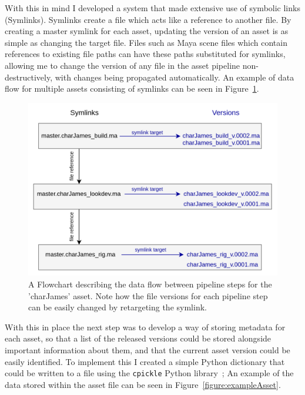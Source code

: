 \documentclass[11pt]{article}
\begin{document}
With this in mind I developed a system that made extensive use of symbolic links (Symlinks). Symlinks create a file which acts like a reference to another file. By creating a master symlink for each asset, updating the version of an asset is as simple as changing the target file. Files such as Maya scene files which contain references to existing file paths can have these paths substituted for symlinks, allowing me to change the version of any file in the asset pipeline non-destructively, with changes being propagated automatically. An example of data flow for multiple assets consisting of symlinks can be seen in Figure~\ref{figure:assetPipeline}.

\begin{figure}[htbp]\centering
	\includegraphics[width=1.0\linewidth]{images/asset_pipeline.png}
	\caption{\label{figure:assetPipeline} A Flowchart describing the data flow between pipeline steps for the 'charJames' asset. Note how the file versions for each pipeline step can be easily changed by retargeting the symlink.}
\end{figure}

With this in place the next step was to develop a way of storing metadata for each asset, so that a list of the released versions could be stored alongside important information about them, and that the current asset version could be easily identified. To implement this I created a simple Python dictionary that could be written to a file using the \texttt{cpickle} Python library~\cite{cpickle}; An example of the data stored within the asset file can be seen in Figure~\ref{figure:exampleAsset}.
\end{document}
